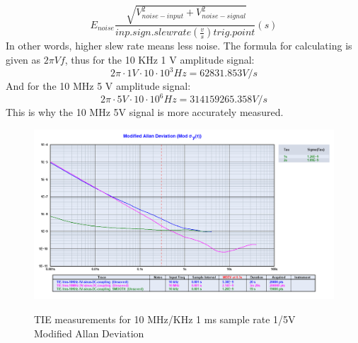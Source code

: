 \documentclass[11pt,english,a4paper]{article}
\begin{document}
\begin{displaymath}
E_{noise}\frac{\sqrt[]{V_{noise-input}^2 + V_{noise-signal}^2}}{inp.sign.slew rate(\frac{v}{s}) trig. point}(s)
\end{displaymath}
In other words, higher slew rate means less noise. The formula for calculating is given as $2\pi Vf$, thus for the 10 KHz 1 V amplitude signal:
\begin{displaymath}
2\pi\cdot1 V\cdot10\cdot10^3 Hz = 62831.853 V/s
\end{displaymath}
And for the 10 MHz 5 V amplitude signal:
\begin{displaymath}
2\pi\cdot5 V\cdot10\cdot10^6 Hz = 314159265.358 V/s
\end{displaymath}
This is why the 10 MHz 5V signal is more accurately measured.

\begin{figure}[!htb]
  \centering
    \includegraphics[width=1\textwidth]{mod_allan_last_part3.png}
    \label{fig:15Vsg_10x_mod_allan_dev}
      \caption{TIE measurements for 10 MHz/KHz 1 ms sample rate 1/5V Modified Allan Deviation}
\end{figure}
\end{document}
